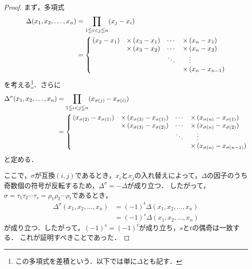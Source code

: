 \begin{tleftbar}
\begin{proof}
  まず，多項式
\begin{align*}
\Delta(x_1,x_2,\dots,x_n)
  &= \prod_{1 \leqq i < j \leqq n}(x_j-x_i) \\
  &= \left\{\,\begin{array}{@{}c@{\quad}r@{\,}l@{\quad}c@{\quad}r@{\,}l@{}}
(x_2-x_1)
  & \times & (x_3-x_1)
  & \cdots
  & \times & (x_n-x_1)\\
  & \times & (x_3-x_2)
  & \cdots
  & \times & (x_n-x_2)\\
  &        &
  & \ddots
  &        & \vdots\\
  &        &
  &
  & \times & (x_n-x_{n-1})
\end{array}\right.
\end{align*}
  を考える\footnote{この多項式を差積という．以下では単に$\Delta$とも記す．}．さらに
\begin{align*}
\Delta^{\sigma}(x_1,x_2,\dots,x_n)
  &= \prod_{1 \leqq i < j \leqq n}
     (x_{\sigma(j)}-x_{\sigma(i)}) \\
  &= \left\{\,\begin{array}{@{}c@{\quad}r@{\,}l@{\quad}c@{\quad}r@{\,}l@{}}
(x_{\sigma(2)}-x_{\sigma(1)})
  & \times & (x_{\sigma(3)}-x_{\sigma(1)})
  & \cdots
  & \times & (x_{\sigma(n)}-x_{\sigma(1)})\\
  & \times & (x_{\sigma(3)}-x_{\sigma(2)})
  & \cdots
  & \times & (x_{\sigma(n)}-x_{\sigma(2)})\\
  &        &
  & \ddots
  &        & \vdots\\
  &        &
  &
  & \times & (x_{\sigma(n)}-x_{\sigma(n-1)})
\end{array}\right.
\end{align*}
  と定める．

  ここで，$\sigma$が互換$(i,j)$であるとき，$x_i$と$x_j$の入れ替えによって，$\Delta$の因子のうち奇数個の符号が反転するため，$\Delta^{\sigma}=-\Delta$が成り立つ．
  したがって，$\sigma = \tau_1 \tau_2 \dotsm \tau_s = \rho_1 \rho_2 \dotsm \rho_t$であるとき，
  \begin{align*}
  \Delta^{\sigma} (x_1, x_2, \dots, x_n) & = (-1)^t \Delta (x_1, x_2, \dots, x_n) \\
  & = (-1)^s \Delta (x_1, x_2, \dots, x_n)
  \end{align*}
  が成り立つ．したがって，$(-1)^s = (-1)^t$が成り立ち，$s$と$t$の偶奇は一致する．
  これが証明すべきことであった．
\end{proof}
\end{tleftbar}

